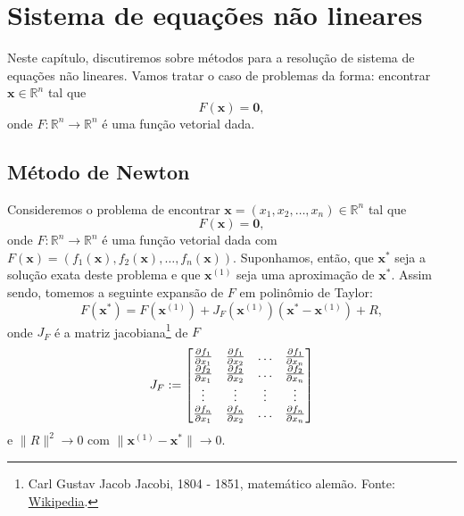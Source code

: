 
\chapter{Sistema de equações não lineares}\label{cap_snl}
\thispagestyle{fancy}

Neste capítulo, discutiremos sobre métodos para a resolução de sistema de equações não lineares. Vamos tratar o caso de problemas da forma: encontrar $\pmb{x}\in\mathbb{R}^n$ tal que
\begin{equation}
  F(\pmb{x}) = \pmb{0},
\end{equation}
onde $F:\mathbb{R}^n\to\mathbb{R}^n$ é uma função vetorial dada.

\section{Método de Newton}\label{cap_snl_sec_newton}

Consideremos o problema de encontrar $\pmb{x} = (x_1, x_2, \dotsc, x_n)\in\mathbb{R}^n$ tal que
\begin{equation}
  F(\pmb{x}) = \pmb{0},
\end{equation}
onde $F:\mathbb{R}^n\to\mathbb{R}^n$ é uma função vetorial dada com $F(\pmb{x}) = (f_1(\pmb{x}), f_2(\pmb{x}), \dotsc, f_n(\pmb{x}))$. Suponhamos, então, que $\pmb{x}^*$ seja a solução exata deste problema e que $\pmb{x}^{(1)}$ seja uma aproximação de $\pmb{x}^*$. Assim sendo, tomemos a seguinte expansão de $F$ em polinômio de Taylor:
\begin{equation}
  F(\pmb{x}^*) = F(\pmb{x}^{(1)}) + J_F(\pmb{x}^{(1)})(\pmb{x}^*-\pmb{x}^{(1)}) + R,
\end{equation}
onde $J_F$ é a matriz jacobiana\footnote{Carl Gustav Jacob Jacobi, 1804 - 1851, matemático alemão. Fonte: \href{https://en.wikipedia.org/wiki/Carl_Gustav_Jacob_Jacobi}{Wikipedia}.} de $F$
\begin{equation}
  J_F :=
  \begin{bmatrix}
    \frac{\partial f_1}{\partial x_1} & \frac{\partial f_1}{\partial x_2} & \ldots & \frac{\partial f_1}{\partial x_n}\\
    \frac{\partial f_2}{\partial x_1} & \frac{\partial f_2}{\partial x_2} & \ldots & \frac{\partial f_2}{\partial x_n}\\
    \vdots & \vdots & \vdots & \vdots \\
    \frac{\partial f_n}{\partial x_1} & \frac{\partial f_n}{\partial x_2} & \ldots & \frac{\partial f_n}{\partial x_n}\\
  \end{bmatrix}
\end{equation}
e $\|R\|^2\to 0$ com $\|\pmb{x}^{(1)}-\pmb{x}^*\|\to 0$. 

